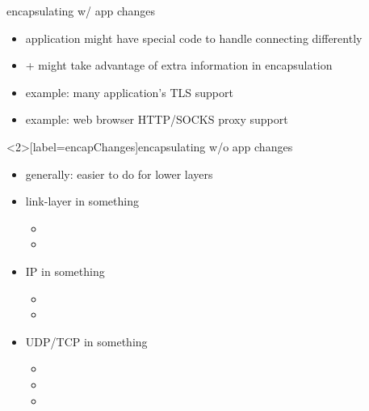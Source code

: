\begin{frame}[label=encapChanges]{encapsulating w/ app changes}
    \begin{itemize}
    \item application might have special code to handle connecting differently
    \item + might take advantage of extra information in encapsulation
    \vspace{.5cm}
    \item example: many application's TLS support
    \item example: web browser HTTP/SOCKS proxy support
    \end{itemize}
\end{frame}

\begin{frame}<2>[label=encapChanges]{encapsulating w/o app changes}
\begin{itemize}
\item generally: easier to do for lower layers
\vspace{.5cm}
\item link-layer in something
    \begin{itemize}
    \item {}
    \item {}
    \end{itemize}
\item IP in something
    \begin{itemize}
    \item {}
    \item {}
    \end{itemize}
\item UDP/TCP in something
    \begin{itemize}
    \item {}
    \item {}
    \item {}
    \end{itemize}
\end{itemize}
\end{frame}


